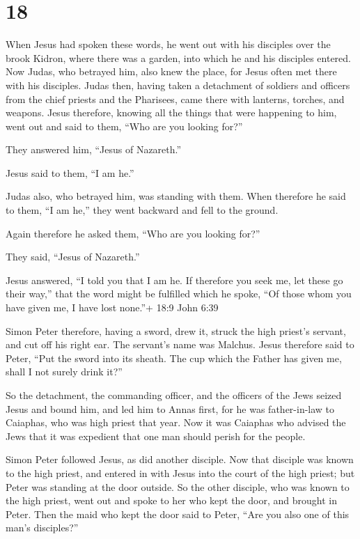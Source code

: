 \hypertarget{section-17}{%
\section{18}\label{section-17}}

 When Jesus had spoken these words, he went out with his
disciples over the brook Kidron, where there was a garden, into which he
and his disciples entered.  Now Judas, who betrayed him,
also knew the place, for Jesus often met there with his disciples.
 Judas then, having taken a detachment of soldiers and
officers from the chief priests and the Pharisees, came there with
lanterns, torches, and weapons.  Jesus therefore, knowing
all the things that were happening to him, went out and said to them,
``Who are you looking for?''

 They answered him, ``Jesus of Nazareth.''

Jesus said to them, ``I am he.''

Judas also, who betrayed him, was standing with them.  When
therefore he said to them, ``I am he,'' they went backward and fell to
the ground.

 Again therefore he asked them, ``Who are you looking for?''

They said, ``Jesus of Nazareth.''

 Jesus answered, ``I told you that I am he. If therefore you
seek me, let these go their way,''  that the word might be
fulfilled which he spoke, ``Of those whom you have given me, I have lost
none.''+ 18:9 John 6:39

 Simon Peter therefore, having a sword, drew it, struck the
high priest's servant, and cut off his right ear. The servant's name was
Malchus.  Jesus therefore said to Peter, ``Put the sword
into its sheath. The cup which the Father has given me, shall I not
surely drink it?''

 So the detachment, the commanding officer, and the
officers of the Jews seized Jesus and bound him,  and led
him to Annas first, for he was father-in-law to Caiaphas, who was high
priest that year.  Now it was Caiaphas who advised the Jews
that it was expedient that one man should perish for the people.

 Simon Peter followed Jesus, as did another disciple. Now
that disciple was known to the high priest, and entered in with Jesus
into the court of the high priest;  but Peter was standing
at the door outside. So the other disciple, who was known to the high
priest, went out and spoke to her who kept the door, and brought in
Peter.  Then the maid who kept the door said to Peter,
``Are you also one of this man's disciples?''


